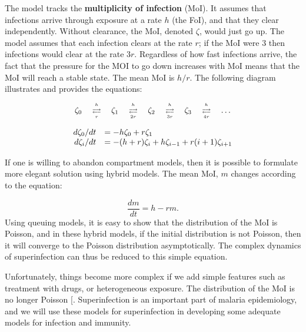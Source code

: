 \documentclass[
]{book}
\begin{document}
The model tracks the \textbf{multiplicity of infection} (MoI). It assumes that infections arrive through exposure at a rate \(h\) (the FoI), and that they clear independently. Without clearance, the MoI, denoted \(\zeta\), would just go up. The model assumes that each infection clears at the rate \(r\); if the MoI were \(3\) then infections would clear at the rate \(3r\). Regardless of how fast infections arrive, the fact that the pressure for the MOI to go down increases with MoI means that the MoI will reach a stable state. The mean MoI is \(h/r.\) The following diagram illustrates and provides the equations:

\begin{equation*}
\begin{array}{c}
%
\begin{array}{ccccccccc}
\zeta_0 &  {h\atop \longrightarrow} \atop {\longleftarrow \atop r} & \zeta_1  & {h\atop \longrightarrow} \atop {\longleftarrow \atop {2r}} & \zeta_2  & {h \atop \longrightarrow} \atop {\longleftarrow \atop {3r}} & \zeta_3  & {h \atop \longrightarrow} \atop {\longleftarrow \atop {4r}}& \ldots 
\end{array} 
\\ 
\\ 
\begin{array}{rl}
d\zeta_0/dt &= -h \zeta_0 + r \zeta_1 \\ 
d \zeta_i /dt &= -(h+r) \zeta_i + h \zeta_{i-1} + r(i+1) \zeta_{i+1} \\
\end{array} 
\end{array}
\end{equation*}

If one is willing to abandon compartment models, then it is possible to formulate more elegant solution using hybrid models. The mean MoI, \(m\) changes according to the equation:

\[\frac{dm}{dt} = h - r m.\]
Using queuing models, it is easy to show that the distribution of the MoI is Poisson, and in these hybrid models, if the initial distribution is not Poisson, then it will converge to the Poisson distribution asymptotically. The complex dynamics of superinfection can thus be reduced to this simple equation.

Unfortunately, things become more complex if we add simple features such as treatment with drugs, or heterogeneous exposure. The distribution of the MoI is no longer Poisson {[}\citeproc{ref-HenryJM2020HybridModel}{77}{]}. Superinfection is an important part of malaria epidemiology, and we will use these models for superinfection in developing some adequate models for infection and immunity.
\end{document}
